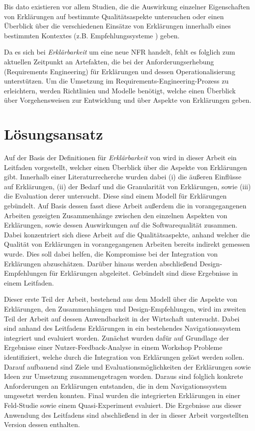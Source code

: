 Bis dato existieren vor allem Studien, die die Auswirkung einzelner Eigenschaften von Erklärungen auf bestimmte Qualitätsaspekte untersuchen oder einen Überblick über die verschiedenen Einsätze von Erklärungen innerhalb eines bestimmten Kontextes (z.B. Empfehlungssysteme \cite{nunes_systematic_2017}) geben.

Da es sich bei \textit{Erklärbarkeit} um eine neue NFR handelt, fehlt es folglich zum aktuellen Zeitpunkt an Artefakten, die bei der Anforderungserhebung (Requirements Engineering) für Erklärungen und dessen Operationalisierung unterstützen. Um die Umsetzung im Requirements-Engineering-Prozess zu erleichtern, werden Richtlinien und Modelle benötigt, welche einen Überblick über Vorgehensweisen zur Entwicklung und über Aspekte von Erklärungen geben. 

\section{Lösungsansatz}

Auf der Basis der Definitionen für \textit{Erklärbarkeit} von \citeauthor[]{chazette_knowledge_nodate} wird in dieser Arbeit ein Leitfaden vorgestellt, welcher einen Überblick über die Aspekte von Erklärungen gibt. Innerhalb einer Literaturrecherche wurden dabei (i) die äußeren Einflüsse auf Erklärungen, (ii) der Bedarf und die Granularität von Erklärungen, sowie (iii) die Evaluation derer untersucht. Diese sind einem Modell für Erklärungen gebündelt. Auf Basis dessen fasst diese Arbeit außerdem die in vorangegangenen Arbeiten gezeigten Zusammenhänge zwischen den einzelnen Aspekten von Erklärungen, sowie dessen Auswirkungen auf die Softwarequalität zusammen. Dabei konzentriert sich diese Arbeit auf die Qualitätsaspekte, anhand welcher die Qualität von Erklärungen in vorangegangenen Arbeiten bereits indirekt gemessen wurde. Dies soll dabei helfen, die Kompromisse bei der Integration von Erklärungen abzuschätzen. Darüber hinaus werden abschließend Design-Empfehlungen für Erklärungen abgeleitet. Gebündelt sind diese Ergebnisse in einem Leitfaden.

Dieser erste Teil der Arbeit, bestehend aus dem Modell über die Aspekte von Erklärungen, den Zusammenhängen und Design-Empfehlungen, wird im zweiten Teil der Arbeit auf dessen Anwendbarkeit in der Wirtschaft untersucht. Dabei sind anhand des Leitfadens Erklärungen in ein bestehendes Navigationssystem integriert und evaluiert worden. Zunächst wurden dafür auf Grundlage der Ergebnisse einer Nutzer-Feedback-Analyse in einem Workshop Probleme identifiziert, welche durch die Integration von Erklärungen gelöst werden sollen. Darauf aufbauend sind Ziele und Evaluationsmöglichkeiten der Erklärungen sowie Ideen zur Umsetzung zusammengetragen worden. Daraus sind folglich konkrete Anforderungen an Erklärungen entstanden, die in dem Navigationssystem umgesetzt werden konnten. Final wurden die integrierten Erklärungen in einer Feld-Studie sowie einem Quasi-Experiment evaluiert. Die Ergebnisse aus dieser Anwendung des Leitfadens sind abschließend in der in dieser Arbeit vorgestellten Version dessen enthalten.

